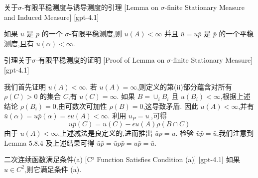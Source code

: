\documentclass[UTF8]{ctexart}
\begin{document}
    
    
    \begin{lma}
        {关于$\sigma$-有限平稳测度与诱导测度的引理}
        [Lemma on $\sigma$-finite Stationary Measure and Induced Measure]
        [gpt-4.1]
        
如果 $
u$ 是 $p$ 的一个 $\sigma$-有限平稳测度,则 $
u(A) < \infty$ 并且 $\bar{
u} = 
u \bar{p}$ 是 $\bar{p}$ 的一个平稳测度,且有 $\bar{
u}(\alpha) < \infty$.

    \end{lma}
    
    
    
    \begin{prf}
        {引理关于$\sigma$-有限平稳测度的证明}
        [Proof of Lemma on $\sigma$-finite Stationary Measure]
        [gpt-4.1]
        
我们首先证明 $
u(A) < \infty$.
若 $
u(A) = \infty$,则定义的第(ii)部分蕴含对所有 $\rho(C) > 0$ 的集合 $C$,有 $
u(C) = \infty$.
如果 $B = \cup_i B_i$ 且 $
u(B_i) < \infty$,根据上述结论 $\rho(B_i) = 0$,由可数次可加性 $\rho(B) = 0$,这导致矛盾.
因此 $
u(A) < \infty$,并有 $\bar{
u}(\alpha) = 
u \bar{p}(\alpha) = \epsilon 
u(A) < \infty$.
利用 $
u_P = 
u_{\cdot}$,可得
\[
u \bar{p}(C) = 
u(C) - \epsilon 
u(A) \rho(B \cap C)
\]
由于 $
u(A) < \infty$,上述减法是良定义的,进而推出 $\bar{
u} p = 
u$.
检验 $\bar{
u}\bar{p} = \bar{
u}$,我们注意到 Lemma 5.8.4 及上述结果可得 $\bar{
u}\bar{p} = \bar{
u} p \bar{p} = 
u \bar{p} = \bar{
u}$.

    \end{prf}
    
    
    
    \begin{thm}
        {二次连续函数满足条件(a)}
        [C² Function Satisfies Condition (a)]
        [gpt-4.1]
        如果 $
u \in C^{2}$,则它满足条件 (a).
    \end{thm}
    
    
    
\end{document}
